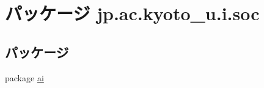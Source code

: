 \hypertarget{namespacejp_1_1ac_1_1kyoto__u_1_1i_1_1soc}{\section{パッケージ jp.\-ac.\-kyoto\-\_\-u.\-i.\-soc}
\label{namespacejp_1_1ac_1_1kyoto__u_1_1i_1_1soc}
}
\subsection*{パッケージ}
\begin{DoxyCompactItemize}
\item 
package \hyperlink{namespacejp_1_1ac_1_1kyoto__u_1_1i_1_1soc_1_1ai}{ai}
\end{DoxyCompactItemize}
